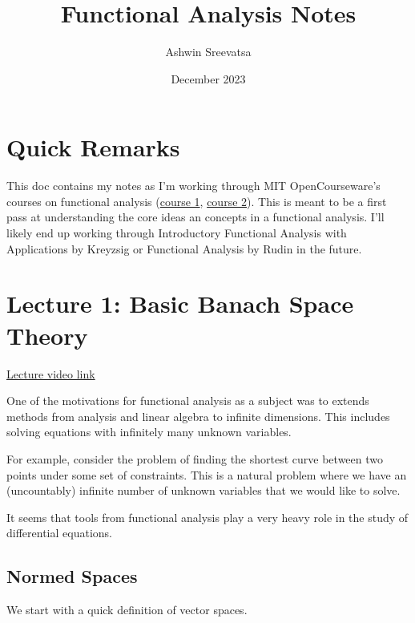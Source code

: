 \documentclass[answers,12pt]{exam}
\title{Functional Analysis Notes}
\author{Ashwin Sreevatsa}
\date{December 2023}
\theoremstyle{definition}
\begin{document}
\maketitle

\section*{Quick Remarks}
This doc contains my notes as I'm working through MIT OpenCourseware's courses on functional analysis (\href{https://ocw.mit.edu/courses/18-102-introduction-to-functional-analysis-spring-2021/}{course 1}, \href{https://ocw.mit.edu/courses/18-102-introduction-to-functional-analysis-spring-2009/}{course 2}).
This is meant to be a first pass at understanding the core ideas an concepts in a functional analysis.
I'll likely end up working through Introductory Functional Analysis with Applications by Kreyzsig or Functional Analysis by Rudin in the future.


\section{Lecture 1: Basic Banach Space Theory}
\href{https://ocw.mit.edu/courses/18-102-introduction-to-functional-analysis-spring-2021/resources/18102-sp21-lecture-1/}{Lecture video link}

One of the motivations for functional analysis as a subject was to extends methods from analysis and linear algebra to infinite dimensions.
This includes solving equations with infinitely many unknown variables.

For example, consider the problem of finding the shortest curve between two points under some set of constraints.
This is a natural problem where we have an (uncountably) infinite number of unknown variables that we would like to solve.

It seems that tools from functional analysis play a very heavy role in the study of differential equations.

\subsection{Normed Spaces}
We start with a quick definition of vector spaces.
\end{document}
